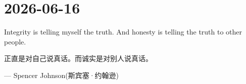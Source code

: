 \section*{2026-06-16}
Integrity is telling myself the truth. And honesty is telling the truth to other people. \par
正直是对自己说真话。而诚实是对别人说真话。 \par
\hfill ---  Spencer Johnson(斯宾塞·约翰逊) \par
